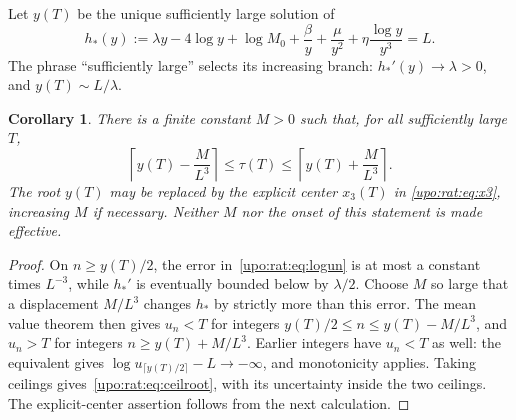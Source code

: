 \documentclass[11pt,letterpaper]{article}
\newtheorem{corollary}[theorem]{Corollary}
\theoremstyle{remark}\newtheorem{remark}[theorem]{Remark}
\numberwithin{equation}{section}
\begin{document}
Let $y(T)$ be the unique sufficiently large solution of
\begin{equation}\label{upo:rat:eq:correctedroot}
h_*(y):=\lambda y-4\log y+\log M_0+
\frac\beta y+\frac\mu{y^2}+\eta\frac{\log y}{y^3}=L.
\end{equation}
The phrase ``sufficiently large'' selects its increasing branch:
$h_*'(y)\to\lambda>0$, and $y(T)\sim L/\lambda$.

\begin{corollary}\label{upo:rat:cor:inverse}
There is a finite constant $M>0$ such that, for all sufficiently large $T$,
\begin{equation}\label{upo:rat:eq:ceilroot}
\left\lceil y(T)-\frac M{L^3}\right\rceil
\le\tau(T)\le
\left\lceil y(T)+\frac M{L^3}\right\rceil.
\end{equation}
The root $y(T)$ may be replaced by the explicit center $x_3(T)$ in
\eqref{upo:rat:eq:x3}, increasing $M$ if necessary. Neither $M$ nor the onset
of this statement is made effective.
\end{corollary}
\begin{proof}
On $n\ge y(T)/2$, the error in~\eqref{upo:rat:eq:logun} is at most a constant
times $L^{-3}$, while $h_*'$ is eventually bounded below by
$\lambda/2$. Choose $M$ so large that a displacement $M/L^3$ changes
$h_*$ by strictly more than this error. The mean value theorem then gives
$u_n<T$ for integers $y(T)/2\le n\le y(T)-M/L^3$, and $u_n>T$ for
integers $n\ge y(T)+M/L^3$. Earlier integers have $u_n<T$ as well:
the equivalent gives
$\log u_{\lceil y(T)/2\rceil}-L\to-\infty$, and monotonicity applies.
Taking ceilings gives~\eqref{upo:rat:eq:ceilroot}, with its uncertainty inside
the two ceilings. The explicit-center assertion follows from the next
calculation.
\end{proof}
\end{document}

